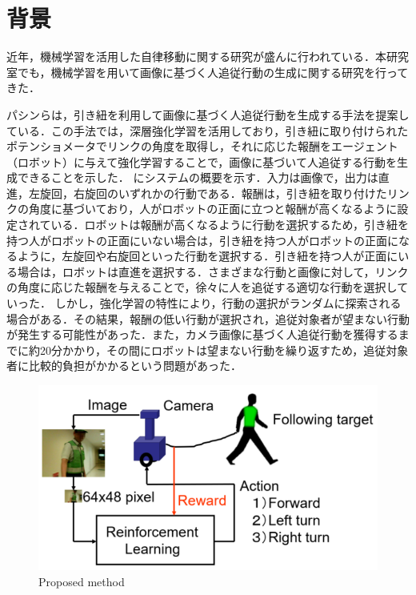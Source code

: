 
\section{背景}
  近年，機械学習を活用した自律移動に関する研究が盛んに行われている．本研究室でも，機械学習を用いて画像に基づく人追従行動の生成に関する研究を行ってきた．

  パシンら\cite{pasin1}\cite{pasin2}\cite{pasin3}は，引き紐を利用して画像に基づく人追従行動を生成する手法を提案している．この手法では，深層強化学習\cite{hado}を活用しており，引き紐に取り付けられたポテンショメータでリンクの角度を取得し，それに応じた報酬をエージェント（ロボット）に与えて強化学習\cite{leslie}することで，画像に基づいて人追従する行動を生成できることを示した．
  にシステムの概要を示す．入力は画像で，出力は直進，左旋回，右旋回のいずれかの行動である．報酬は，引き紐を取り付けたリンクの角度に基づいており，人がロボットの正面に立つと報酬が高くなるように設定されている．ロボットは報酬が高くなるように行動を選択するため，引き紐を持つ人がロボットの正面にいない場合は，引き紐を持つ人がロボットの正面になるように，左旋回や右旋回といった行動を選択する．引き紐を持つ人が正面にいる場合は，ロボットは直進を選択する．さまざまな行動と画像に対して，リンクの角度に応じた報酬を与えることで，徐々に人を追従する適切な行動を選択していった．
  しかし，強化学習の特性により，行動の選択がランダムに探索される場合がある．その結果，報酬の低い行動が選択され，追従対象者が望まない行動が発生する可能性があった．また，カメラ画像に基づく人追従行動を獲得するまでに約20分かかり，その間にロボットは望まない行動を繰り返すため，追従対象者に比較的負担がかかるという問題があった．

\newpage

  \begin{figure}[h]
    \centering
    \includegraphics[keepaspectratio, scale=0.45] {images/pasin_system.png}
    \caption{Proposed method \cite{pasin1}}
    \label{Fig:pasin_system}
  \end{figure}

